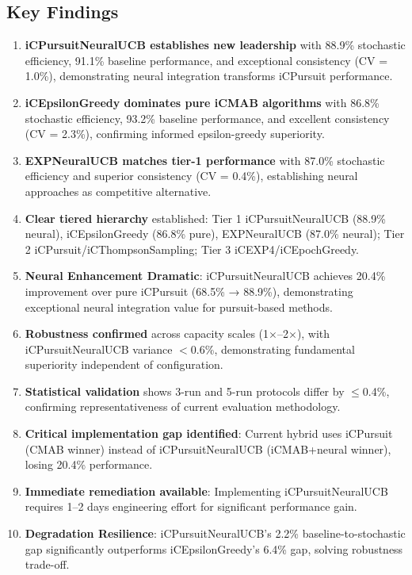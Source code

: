 \documentclass[12pt,a4paper]{article}
\newcommand{\primarytext}[1]{\textcolor{primaryblue}{\textbf{#1}}}
\newcommand{\secondarytext}[1]{\textcolor{secondaryblue}{\textbf{#1}}}
\newcommand{\success}[1]{\textcolor{accentgreen}{\textbf{#1}}}
\newcommand{\warning}[1]{\textcolor{warningred}{\textbf{#1}}}
\newcommand{\legacy}[1]{\textcolor{legacycolor}{\textbf{#1}}}
\newcommand{\neural}[1]{\textcolor{neuralcolor}{\textbf{#1}}}
\begin{document}
\subsection{Key Findings}
\begin{enumerate}
\item \neural{iCPursuitNeuralUCB establishes new leadership} with 88.9\% stochastic efficiency, 91.1\% baseline performance, and exceptional consistency (CV = 1.0\%), demonstrating neural integration transforms iCPursuit performance.
\item \primarytext{iCEpsilonGreedy dominates pure iCMAB algorithms} with 86.8\% stochastic efficiency, 93.2\% baseline performance, and excellent consistency (CV = 2.3\%), confirming informed epsilon-greedy superiority.
\item \legacy{EXPNeuralUCB matches tier-1 performance} with 87.0\% stochastic efficiency and superior consistency (CV = 0.4\%), establishing neural approaches as competitive alternative.
\item \secondarytext{Clear tiered hierarchy} established: Tier 1 iCPursuitNeuralUCB (88.9\% neural), iCEpsilonGreedy (86.8\% pure), EXPNeuralUCB (87.0\% neural); Tier 2 iCPursuit/iCThompsonSampling; Tier 3 iCEXP4/iCEpochGreedy.
\item \success{Neural Enhancement Dramatic}: iCPursuitNeuralUCB achieves 20.4\% improvement over pure iCPursuit (68.5\% → 88.9\%), demonstrating exceptional neural integration value for pursuit-based methods.
\item \success{Robustness confirmed} across capacity scales (1$\times$--2$\times$), with iCPursuitNeuralUCB variance $<$0.6\%, demonstrating fundamental superiority independent of configuration.
\item \success{Statistical validation} shows 3-run and 5-run protocols differ by $\leq$0.4\%, confirming representativeness of current evaluation methodology.
\item \warning{Critical implementation gap identified}: Current hybrid uses iCPursuit (CMAB winner) instead of iCPursuitNeuralUCB (iCMAB+neural winner), losing 20.4\% performance.
\item \success{Immediate remediation available}: Implementing iCPursuitNeuralUCB requires 1--2 days engineering effort for significant performance gain.
\item \success{Degradation Resilience}: iCPursuitNeuralUCB's 2.2\% baseline-to-stochastic gap significantly outperforms iCEpsilonGreedy's 6.4\% gap, solving robustness trade-off.
\end{enumerate}
\end{document}
